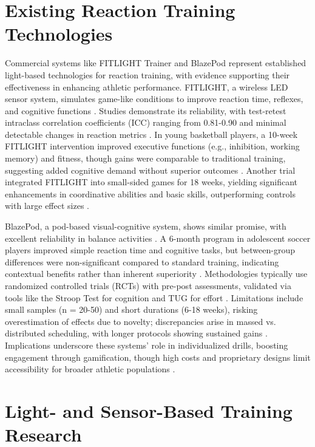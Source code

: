 \section{Existing Reaction Training Technologies}

Commercial systems like FITLIGHT Trainer and BlazePod represent established light-based technologies for reaction training, with evidence supporting their effectiveness in enhancing athletic performance. FITLIGHT, a wireless LED sensor system, simulates game-like conditions to improve reaction time, reflexes, and cognitive functions \cite{Hassan:2025:FTI}. Studies demonstrate its reliability, with test-retest intraclass correlation coefficients (ICC) ranging from 0.81-0.90 and minimal detectable changes in reaction metrics \cite{Steff:2024:SIE}. In young basketball players, a 10-week FITLIGHT intervention improved executive functions (e.g., inhibition, working memory) and fitness, though gains were comparable to traditional training, suggesting added cognitive demand without superior outcomes \cite{Hassan:2025:FTI}. Another trial integrated FITLIGHT into small-sided games for 18 weeks, yielding significant enhancements in coordinative abilities and basic skills, outperforming controls with large effect sizes \cite{Steff:2024:IAR}.

BlazePod, a pod-based visual-cognitive system, shows similar promise, with excellent reliability in balance activities \cite{Cekok:2025:EBV}. A 6-month program in adolescent soccer players improved simple reaction time and cognitive tasks, but between-group differences were non-significant compared to standard training, indicating contextual benefits rather than inherent superiority \cite{Theofilou:2022:EVS}. Methodologies typically use randomized controlled trials (RCTs) with pre-post assessments, validated via tools like the Stroop Test for cognition and TUG for effort \cite{Cekok:2025:EBV}. Limitations include small samples (n = 20-50) and short durations (6-18 weeks), risking overestimation of effects due to novelty; discrepancies arise in massed vs. distributed scheduling, with longer protocols showing sustained gains \cite{Steff:2024:IAR}. Implications underscore these systems' role in individualized drills, boosting engagement through gamification, though high costs and proprietary designs limit accessibility for broader athletic populations \cite{Hassan:2025:FTI}.


\section{Light- and Sensor-Based Training Research}

